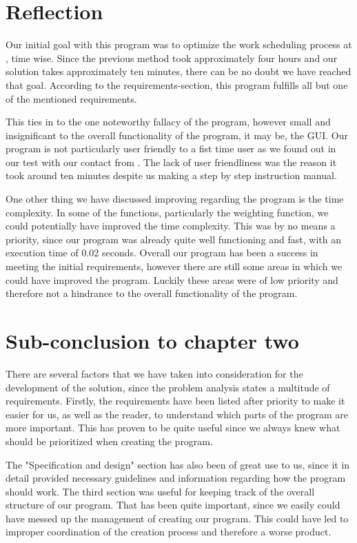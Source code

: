 \section{Reflection}
Our initial goal with this program was to optimize the work scheduling process at \siemens, time wise. Since the previous method took approximately four hours and our solution takes approximately ten minutes, there can be no doubt we have reached that goal. According to the requirements-section, this program fulfills all but one of the mentioned requirements.

This ties in to the one noteworthy fallacy of the program, however small and insignificant to the overall functionality of the program, it may be, the GUI. Our program is not particularly user friendly to a fist time user as we found out in our test with our contact from \siemens. The lack of user friendliness was the reason it took around ten minutes despite us making a step by step instruction manual.

One other thing we have discussed improving regarding the program is the time complexity. In some of the functions, particularly the weighting function, we could potentially have improved the time complexity. This was by no means a priority, since our program was already quite well functioning and fast, with an execution time of 0.02 seconds. Overall our program has been a success in meeting the initial requirements, however there are still some areas in which we could have improved the program. Luckily these areas were of low priority and therefore not a hindrance to the overall functionality of the program.

\section{Sub-conclusion to chapter two}
There are several factors that we have taken into consideration for the development of the solution, since the problem analysis states a multitude of requirements. Firstly, the requirements have been listed after priority to make it easier for us, as well as the reader, to understand which parts of the program are more important. This has proven to be quite useful since we always knew what should be prioritized when creating the program.

The "Specification and design" section has also been of great use to us, since it in detail provided necessary guidelines and information regarding how the program should work. The third section was useful for keeping track of the overall structure of our program. That has been quite important, since we easily could have messed up the management of creating our program. This could have led to improper coordination of the creation process and therefore a worse product.

